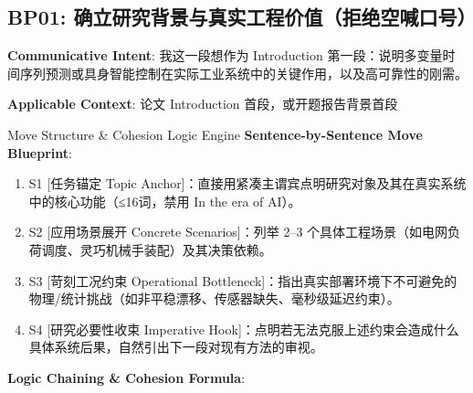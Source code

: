 \subsection{BP01: 确立研究背景与真实工程价值（拒绝空喊口号）}\label{sec:bp:BP01}
\noindent\textbf{\color{AcadNavy}Communicative Intent}: 我这一段想作为 Introduction 第一段：说明多变量时间序列预测或具身智能控制在实际工业系统中的关键作用，以及高可靠性的刚需。\par\vspace{2pt}
\noindent\textbf{\color{AcadSlate}Applicable Context}: 论文 Introduction 首段，或开题报告背景首段\par\vspace{4pt}
\begin{ConceptBox}{Move Structure \& Cohesion Logic Engine}
\textbf{Sentence-by-Sentence Move Blueprint}:
\begin{enumerate}[label=\textbf{\color{AcadNavy}S\arabic*.}, leftmargin=2em, itemsep=2pt]
  \item S1 [任务锚定 Topic Anchor]：直接用紧凑主谓宾点明研究对象及其在真实系统中的核心功能（≤16词，禁用 In the era of AI）。
  \item S2 [应用场景展开 Concrete Scenarios]：列举 2--3 个具体工程场景（如电网负荷调度、灵巧机械手装配）及其决策依赖。
  \item S3 [苛刻工况约束 Operational Bottleneck]：指出真实部署环境下不可避免的物理/统计挑战（如非平稳漂移、传感器缺失、毫秒级延迟约束）。
  \item S4 [研究必要性收束 Imperative Hook]：点明若无法克服上述约束会造成什么具体系统后果，自然引出下一段对现有方法的审视。
\end{enumerate}\par\vspace{4pt}
\textbf{Logic Chaining \& Cohesion Formula}:\par{}
\end{ConceptBox}
